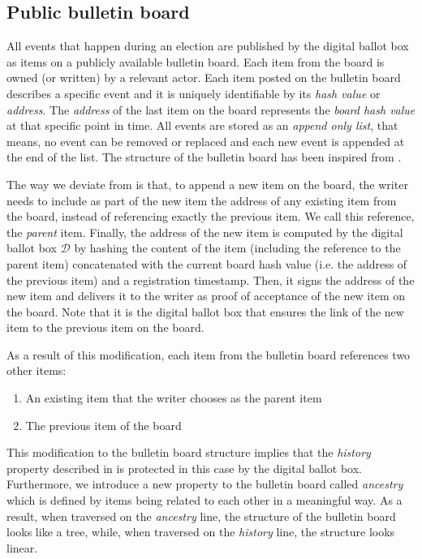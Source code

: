 \subsection{Public bulletin board} \label{sec: public bulletin board}
All events that happen during an election are published by the digital ballot box as items on a publicly available bulletin board. Each item from the board is owned (or written) by a relevant actor. Each item posted on the bulletin board describes a specific event and it is uniquely identifiable by its \textit{hash value} or \textit{address}. The \textit{address} of the last item on the board represents the \textit{board hash value} at that specific point in time. All events are stored as an \textit{append only list}, that means, no event can be removed or replaced and each new event is appended at the end of the list. The structure of the bulletin board has been inspired from \cite{Heather09}.

The way we deviate from \cite{Heather09} is that, to append a new item on the board, the writer needs to include as part of the new item the address of any existing item from the board, instead of referencing exactly the previous item. We call this reference, the \textit{parent} item. Finally, the address of the new item is computed by the digital ballot box $\mathcal{D}$ by hashing the content of the item (including the reference to the parent item) concatenated with the current board hash value (i.e. the address of the previous item) and a registration timestamp. Then, it signs the address of the new item and delivers it to the writer as proof of acceptance of the new item on the board. Note that it is the digital ballot box that ensures the link of the new item to the previous item on the board.

As a result of this modification, each item from the bulletin board references two other items:
\begin{enumerate}
    \item An existing item that the writer chooses as the parent item
    \item The previous item of the board
\end{enumerate}

This modification to the bulletin board structure implies that the \textit{history} property described in \cite{Heather09} is protected in this case by the digital ballot box. Furthermore, we introduce a new property to the bulletin board called \textit{ancestry} which is defined by items being related to each other in a meaningful way. As a result, when traversed on the \textit{ancestry} line, the structure of the bulletin board looks like a tree, while, when traversed on the \textit{history} line, the structure looks linear. 

